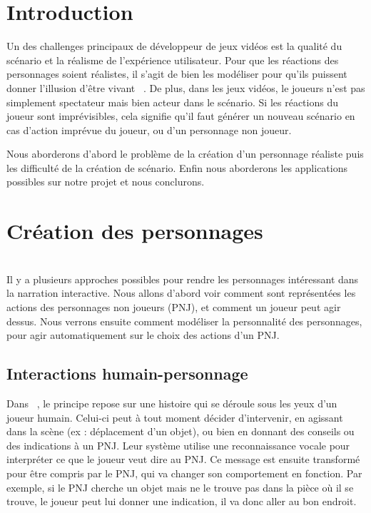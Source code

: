 \documentclass[asi]{picINSA}
\begin{document}
    
    \couverture{}

\tableofcontents{}

\chapter*{Introduction}

Un des challenges principaux de développeur de jeux vidéos est la qualité du scénario et la réalisme de l'expérience utilisateur.
Pour que les réactions des personnages soient réalistes, il s'agit de bien les modéliser pour
qu'ils puissent donner l'illusion d'être vivant ~\cite{Bates94therole}. De plus, dans les jeux vidéos, le joueurs 
n'est pas simplement spectateur mais bien acteur dans le scénario. Si les réactions du joueur sont imprévisibles,
cela signifie qu'il faut générer un nouveau scénario en cas d'action imprévue du joueur, ou d'un personnage non joueur.

Nous aborderons d'abord le problème de la création d'un personnage réaliste puis les difficulté de la création de scénario.
Enfin nous aborderons les applications possibles sur notre projet et nous conclurons.

\chapter{Création des personnages}
~\\
Il y a plusieurs approches possibles pour rendre les personnages intéressant dans la narration interactive. Nous allons d'abord voir comment sont représentées les actions des personnages non joueurs (PNJ), et comment un joueur peut agir dessus. Nous verrons ensuite comment modéliser la personnalité des personnages, pour agir automatiquement sur le choix des actions d'un PNJ.\\


\section{Interactions humain-personnage}

Dans ~\cite{IRIS:conf/aamas/CavazzaCM2002}, le principe repose sur une histoire qui se déroule sous les yeux d'un joueur humain. Celui-ci peut à tout moment décider d'intervenir, en agissant dans la scène (ex : déplacement d'un objet), ou bien en donnant des conseils ou des indications à un PNJ. Leur système utilise une reconnaissance vocale pour interpréter ce que le joueur veut dire au PNJ. Ce message est ensuite transformé pour être compris par le PNJ, qui va changer son comportement en fonction. Par exemple, si le PNJ cherche un objet mais ne le trouve pas dans la pièce où il se trouve, le joueur peut lui donner une indication, il va donc aller au bon endroit.\\
\end{document}
